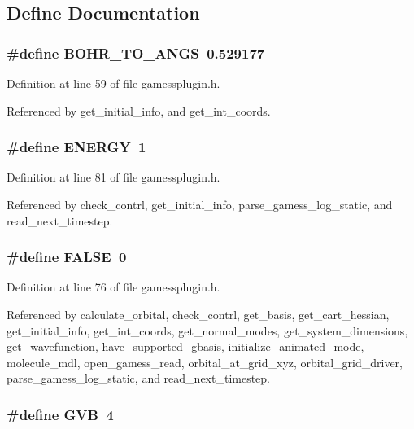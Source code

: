 \subsection{Define Documentation}
\subsubsection{\setlength{\rightskip}{0pt plus 5cm}\#define BOHR\_\-TO\_\-ANGS\ 0.529177}\label{gamessplugin_8h_a3}




Definition at line 59 of file gamessplugin.h.

Referenced by get\_\-initial\_\-info, and get\_\-int\_\-coords.
\subsubsection{\setlength{\rightskip}{0pt plus 5cm}\#define ENERGY\ 1}\label{gamessplugin_8h_a8}




Definition at line 81 of file gamessplugin.h.

Referenced by check\_\-contrl, get\_\-initial\_\-info, parse\_\-gamess\_\-log\_\-static, and read\_\-next\_\-timestep.
\subsubsection{\setlength{\rightskip}{0pt plus 5cm}\#define FALSE\ 0}\label{gamessplugin_8h_a6}




Definition at line 76 of file gamessplugin.h.

Referenced by calculate\_\-orbital, check\_\-contrl, get\_\-basis, get\_\-cart\_\-hessian, get\_\-initial\_\-info, get\_\-int\_\-coords, get\_\-normal\_\-modes, get\_\-system\_\-dimensions, get\_\-wavefunction, have\_\-supported\_\-gbasis, initialize\_\-animated\_\-mode, molecule\_\-mdl, open\_\-gamess\_\-read, orbital\_\-at\_\-grid\_\-xyz, orbital\_\-grid\_\-driver, parse\_\-gamess\_\-log\_\-static, and read\_\-next\_\-timestep.
\subsubsection{\setlength{\rightskip}{0pt plus 5cm}\#define GVB\ 4}\label{gamessplugin_8h_a15}




